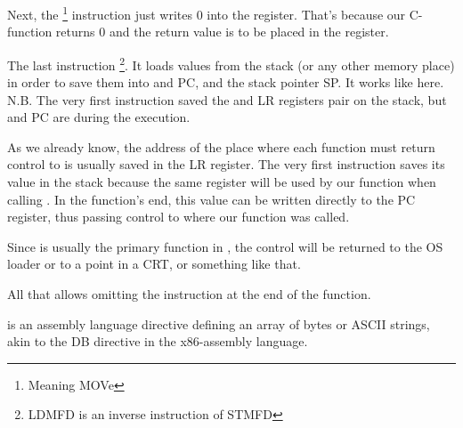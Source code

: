 Next, the \footnote{Meaning MOVe} instruction just writes 0 into the  register.
That's because our C-function returns 0 and the return value is to be placed in the  register.

The last instruction \footnote{\ac{LDMFD} is an inverse instruction of \ac{STMFD}}.
It loads values from the stack (or any other memory place) in order to save them into  and \ac{PC}, and  the \gls{stack pointer} \ac{SP}.
It works like \POP here.\\
N.B. The very first instruction  saved the  and \ac{LR} registers pair on the stack, but  and \ac{PC} are  during the  execution.

As we already know, the address of the place where each function must return control to is usually saved in the \ac{LR} register.
The very first instruction saves its value in the stack because the same register will be used by our
\main function when calling \printf.
In the function's end, this value can be written directly to the \ac{PC} register, thus passing control to where our function was called.

Since \main is usually the primary function in \CCpp,
the control will be returned to the \ac{OS} loader or to a point in a \ac{CRT},
or something like that.

All that allows omitting the  instruction at the end of the function.

 is an assembly language directive defining an array of bytes or ASCII strings, akin to the DB directive 
in the x86-assembly language.

